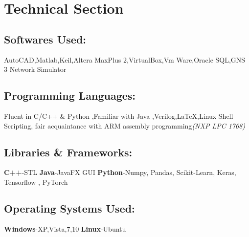 \documentclass{article}
\begin{document}
\section*{Technical Section}
\subsection*{Softwares Used:}
AutoCAD,Matlab,Keil,Altera MaxPlus 2,VirtualBox,Vm Ware,Oracle SQL,GNS 3 Network Simulator
\subsection*{Programming Languages:}
Fluent in C/C++ \& Python ,Familiar with Java ,Verilog,{\LaTeX},Linux Shell Scripting,
fair acquaintance with ARM assembly programming\textit{(NXP LPC 1768)}
\subsection*{Libraries \& Frameworks:}
\textbf{C++}-STL
\textbf{Java}-JavaFX GUI
\textbf{Python}-Numpy, Pandas, Scikit-Learn, Keras, Tensorflow , PyTorch
\subsection*{Operating Systems Used:}
\textbf{Windows}-XP,Vista,7,10
\textbf{Linux}-Ubuntu
\end{document}
